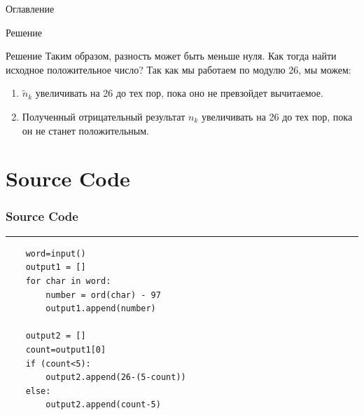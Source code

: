 \documentclass[12pt]{beamer}
\begin{document}
\begin{frame}{Оглавление}
\begin{frame}{Решение}
\end{frame}

\begin{frame}{Решение}
    Таким образом, разность может быть меньше нуля. Как тогда найти исходное положительное число? Так как мы работаем по модулю 26, мы можем:
    \begin{enumerate}
        \item $\widetilde{n}_{k}$ увеличивать на 26 до тех пор, пока оно не превзойдет вычитаемое.
        \item Полученный отрицательный результат ${n}_{k}$ увеличивать на 26 до тех пор, пока он не станет положительным.
    \end{enumerate}
    
    
\end{frame}

\section{Source Code}

\begin{frame}[fragile]
    \frametitle{Source Code}
    \rule{\textwidth}{1pt}
    \scriptsize
    \begin{verbatim}
    word=input()
    output1 = []
    for char in word:
        number = ord(char) - 97
        output1.append(number)

    output2 = []
    count=output1[0]
    if (count<5):
        output2.append(26-(5-count))
    else:
        output2.append(count-5)
    \end{verbatim}
        
        

\end{frame}
\end{frame}
\end{document}

